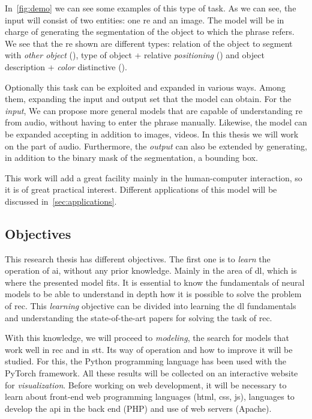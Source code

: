 In\ \vref{fig:demo} we can see some examples of this type of task. As we can
see, the input will consist of two entities: one \gls{re} and an image. The
model will be in charge of generating the segmentation of the object to which
the phrase refers. We see that the \gls{re} shown are different types: relation
of the object to segment with \emph{other object} (), type
of object + relative \emph{positioning} () and object
description + \emph{color} distinctive ().

Optionally this task can be exploited and expanded in various ways. Among them,
expanding the input and output set that the model can obtain. For the
\emph{input}, We can propose more general models that are capable of
understanding \gls{re} from audio, without having to enter the phrase
manually. Likewise, the model can be expanded accepting in addition to images,
videos. In this thesis we will work on the part of audio. Furthermore, the
\emph{output} can also be extended by generating, in addition to the binary
mask of the segmentation, a bounding box.

This work will add a great facility mainly in the human-computer interaction,
so it is of great practical interest. Different applications of this model will
be discussed in\ \vref{sec:applications}.


\subsection{Objectives}

This research thesis has different objectives. The first one is to \emph{learn}
the operation of \gls{ai}, without any prior knowledge. Mainly in the area of
\gls{dl}, which is where the presented model fits. It is essential to know the
fundamentals of neural models to be able to understand in depth how it is
possible to solve the problem of \gls{rec}. This \emph{learning} objective can
be divided into learning the \gls{dl} fundamentals and understanding the
state-of-the-art papers for solving the task of \gls{rec}.

With this knowledge, we will proceed to \emph{modeling}, the search for models
that work well in \gls{rec} and in \gls{stt}. Its way of operation and how to
improve it will be studied. For this, the Python programming language has been
used with the PyTorch framework. All these results will be collected on an
interactive website for \emph{visualization}. Before working on web
development, it will be necessary to learn about front-end web programming
languages (\acs{html}, \acs{css}, \acs{js}), languages to develop the \gls{api}
in the back end (PHP) and use of web servers (Apache).

